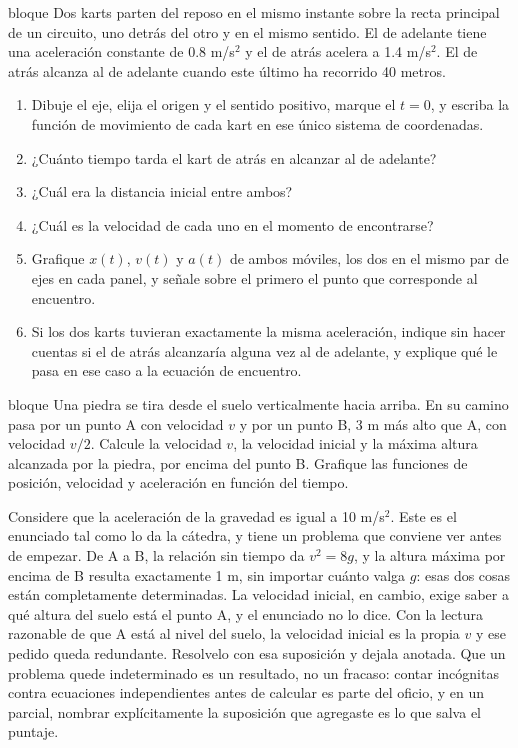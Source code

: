 \documentclass[11pt,openany]{book}
\begin{document}
\begin{ejercicio}{bloque}
Dos karts parten del reposo en el mismo instante sobre la recta principal de un circuito, uno detrás del otro y en el mismo sentido. El de adelante tiene una aceleración constante de 0.8 m/s$^2$ y el de atrás acelera a 1.4 m/s$^2$. El de atrás alcanza al de adelante cuando este último ha recorrido 40 metros.
\begin{enumerate}[label=(\alph*), leftmargin=1.7em, itemsep=1pt, topsep=3pt]
  \item Dibuje el eje, elija el origen y el sentido positivo, marque el $t = 0$, y escriba la función de movimiento de cada kart en ese único sistema de coordenadas.
  \item ¿Cuánto tiempo tarda el kart de atrás en alcanzar al de adelante?
  \item ¿Cuál era la distancia inicial entre ambos?
  \item ¿Cuál es la velocidad de cada uno en el momento de encontrarse?
  \item Grafique $x(t)$, $v(t)$ y $a(t)$ de ambos móviles, los dos en el mismo par de ejes en cada panel, y señale sobre el primero el punto que corresponde al encuentro.
  \item Si los dos karts tuvieran exactamente la misma aceleración, indique sin hacer cuentas si el de atrás alcanzaría alguna vez al de adelante, y explique qué le pasa en ese caso a la ecuación de encuentro.
\end{enumerate}
\end{ejercicio}

\begin{ejercicio}{bloque}
Una piedra se tira desde el suelo verticalmente hacia arriba. En su camino pasa por un punto A con velocidad $v$ y por un punto B, 3 m más alto que A, con velocidad $v/2$. Calcule la velocidad $v$, la velocidad inicial y la máxima altura alcanzada por la piedra, por encima del punto B. Grafique las funciones de posición, velocidad y aceleración en función del tiempo.

\medskip
{\footnotesize Considere que la aceleración de la gravedad es igual a 10 m/s$^2$. Este es el enunciado tal como lo da la cátedra, y tiene un problema que conviene ver antes de empezar. De A a B, la relación sin tiempo da $v^2 = 8g$, y la altura máxima por encima de B resulta exactamente 1 m, sin importar cuánto valga $g$: esas dos cosas están completamente determinadas. La velocidad inicial, en cambio, exige saber a qué altura del suelo está el punto A, y el enunciado no lo dice. Con la lectura razonable de que A está al nivel del suelo, la velocidad inicial es la propia $v$ y ese pedido queda redundante. Resolvelo con esa suposición y dejala anotada. Que un problema quede indeterminado es un resultado, no un fracaso: contar incógnitas contra ecuaciones independientes antes de calcular es parte del oficio, y en un parcial, nombrar explícitamente la suposición que agregaste es lo que salva el puntaje.}
\end{ejercicio}
\end{document}

